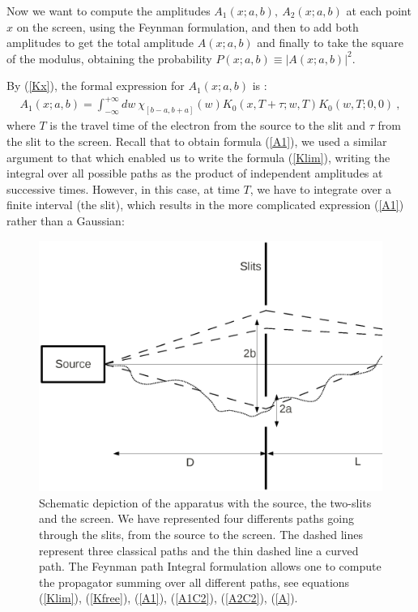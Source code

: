 \documentclass[12pt,aps,prb,preprint]{revtex4-1}   %
\begin{document}
Now we want to compute the amplitudes $A_1(x;a,b),\ A_2(x;a,b)$
at each point $x$ on the screen, using the Feynman formulation,
and then to add both amplitudes to get the total amplitude
$A(x;a,b)$ and finally to take the square of the modulus,
obtaining the probability $P(x;a,b)\equiv |A(x;a,b)|^2$.

By (\ref{Kx}), the formal expression for $A_1(x;a,b)$ is :
\begin{eqnarray}\label{A1}
A_1(x;a,b)=\int_{-\infty}^{+\infty} dw\ \chi_{[b-a,b+a]}(w)
K_0(x,T+\tau;w,T) K_0(w,T;0,0)\ ,
\end{eqnarray}
where $T$ is the travel time of the electron from the source to
the slit and $\tau$ from the slit to the screen. 
Recall that to obtain formula
(\ref{A1}), we used a similar argument to that which enabled us to
write the formula (\ref{Klim}), writing the integral over all
possible paths as the product of independent amplitudes at
successive times. However, in this case, at time $ T $, we have to
integrate over a finite interval (the slit), which results in the
more complicated expression (\ref{A1}) rather than a Gaussian:

\begin{figure}
 \centering
\includegraphics[width=130mm]{Fig1.ps}
\caption{\label{Fig.1} Schematic depiction of the apparatus with
the source, the two-slits and the screen.
We have represented four differents paths going through the slits, from the source to the screen.
{The dashed lines represent three classical paths and the thin dashed line a curved path.
The Feynman path Integral formulation allows one to compute the propagator 
summing over all different paths, see equations 
(\ref{Klim}), (\ref{Kfree}), (\ref{A1}), (\ref{A1C2}), (\ref{A2C2}), (\ref{A}).}}
\end{figure}
\end{document}
